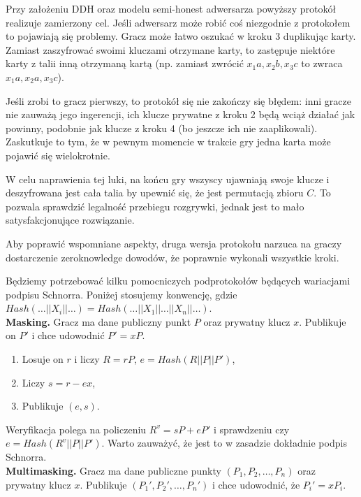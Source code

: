 \documentclass{article}
\begin{document}
Przy założeniu DDH oraz modelu semi-honest adwersarza powyższy protokół realizuje zamierzony cel. Jeśli adwersarz może robić coś niezgodnie z protokołem to pojawiają się problemy. Gracz może łatwo oszukać w kroku 3 duplikując karty. Zamiast zaszyfrować swoimi kluczami otrzymane karty, to zastępuje niektóre karty z talii inną otrzymaną kartą (np. zamiast zwrócić $x_1a,x_2b,x_3c$ to zwraca $x_1a,x_2a,x_3c$).

Jeśli zrobi to gracz pierwszy, to protokół się nie zakończy się błędem: inni gracze nie zauważą jego ingerencji, ich klucze prywatne z kroku 2 będą wciąż działać jak powinny, podobnie jak klucze z kroku 4 (bo jeszcze ich nie zaaplikowali). Zaskutkuje to tym, że w pewnym momencie w trakcie gry jedna karta może pojawić się wielokrotnie.

W celu naprawienia tej luki, na końcu gry wszyscy ujawniają swoje klucze i deszyfrowana jest cała talia by upewnić się, że jest permutacją zbioru $C$. To pozwala sprawdzić legalność przebiegu rozgrywki, jednak jest to mało satysfakcjonujące rozwiązanie.

Aby poprawić wspomniane aspekty, druga wersja protokołu narzuca na graczy dostarczenie zero\-knowledge dowodów, że poprawnie wykonali wszystkie kroki.

Będziemy potrzebować kilku pomocniczych podprotokołów będących wariacjami podpisu Schnorra. Poniżej stosujemy konwencję, gdzie $Hash(\ldots || X_i || \ldots) = Hash(\ldots || X_1 || \ldots || X_n || \ldots)$.
\\

\noindent \textbf{Masking.} Gracz ma dane publiczny punkt $P$ oraz prywatny klucz $x$. Publikuje on $P'$ i chce udowodnić $P' = xP$.
\\

\noindent \begin{enumerate}
    \item Losuje on $r$ i liczy $R = rP$, $e = Hash(R || P || P')$,
    \item Liczy $s = r - ex$,
    \item Publikuje $(e,s)$.
\end{enumerate} 

\noindent Weryfikacja polega na policzeniu $R^v = sP + eP'$ i sprawdzeniu czy $e = Hash(R^v || P || P')$. Warto zauważyć, że jest to w zasadzie dokładnie podpis Schnorra.
\\

\noindent \textbf{Multimasking.}
Gracz ma dane publiczne punkty $(P_1,P_2,\ldots,P_n)$ oraz prywatny klucz $x$. Publikuje $(P_1',P_2',\ldots,P_n')$ i chce udowodnić, że $P_i'=xP_i$.
\\
\end{document}
